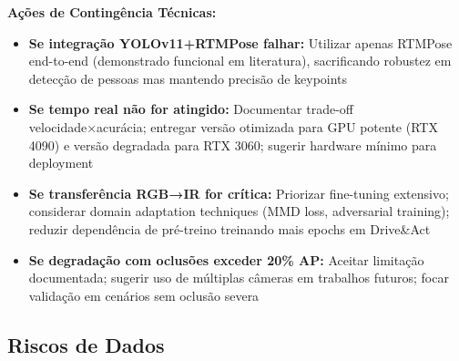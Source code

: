 \documentclass[12pt, a4paper]{article}
\begin{document}
\textbf{Ações de Contingência Técnicas:}
\begin{itemize}
    \item \textbf{Se integração YOLOv11+RTMPose falhar:} Utilizar apenas RTMPose end-to-end (demonstrado funcional em literatura), sacrificando robustez em detecção de pessoas mas mantendo precisão de keypoints
    
    \item \textbf{Se tempo real não for atingido:} Documentar trade-off velocidade×acurácia; entregar versão otimizada para GPU potente (RTX 4090) e versão degradada para RTX 3060; sugerir hardware mínimo para deployment
    
    \item \textbf{Se transferência RGB→IR for crítica:} Priorizar fine-tuning extensivo; considerar domain adaptation techniques (MMD loss, adversarial training); reduzir dependência de pré-treino treinando mais epochs em Drive\&Act
    
    \item \textbf{Se degradação com oclusões exceder 20\% AP:} Aceitar limitação documentada; sugerir uso de múltiplas câmeras em trabalhos futuros; focar validação em cenários sem oclusão severa
\end{itemize}

\subsection{Riscos de Dados}
\end{document}
